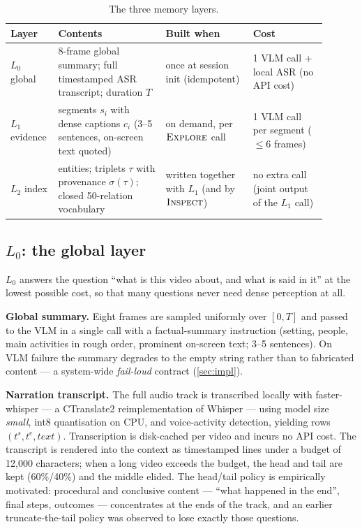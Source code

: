 \begin{table}[t]
  \centering
  \small
  \caption{The three memory layers.}
  \label{tab:layers}
  \begin{tabular}{@{}p{0.10\linewidth}p{0.32\linewidth}p{0.26\linewidth}p{0.22\linewidth}@{}}
    \toprule
    Layer & Contents & Built when & Cost \\
    \midrule
    $L_0$ global & 8-frame global summary; full timestamped ASR transcript; duration $T$ & once at session init (idempotent) & 1 VLM call + local ASR (no API cost) \\
    $L_1$ evidence & segments $s_i$ with dense captions $c_i$ (3--5 sentences, on-screen text quoted) & on demand, per $\textsc{Explore}$ call & 1 VLM call per segment ($\leq 6$ frames) \\
    $L_2$ index & entities; triplets $\tau$ with provenance $\sigma(\tau)$; closed 50-relation vocabulary & written together with $L_1$ (and by $\textsc{Inspect}$) & no extra call (joint output of the $L_1$ call) \\
    \bottomrule
  \end{tabular}
\end{table}

\subsection{$L_0$: the global layer}
\label{subsec:l0}

$L_0$ answers the question ``what is this video about, and what is said in it'' at the lowest
possible cost, so that many questions never need dense perception at all.

\textbf{Global summary.} Eight frames are sampled uniformly over $[0, T]$ and passed to the VLM in a
single call with a factual-summary instruction (setting, people, main activities in rough order,
prominent on-screen text; 3--5 sentences). On VLM failure the summary degrades to the empty string
rather than to fabricated content --- a system-wide \emph{fail-loud} contract (\cref{sec:impl}).

\textbf{Narration transcript.} The full audio track is transcribed locally with faster-whisper --- a
CTranslate2 reimplementation of Whisper \cite{radford2023whisper} --- using model size \emph{small}, int8
quantisation on CPU, and voice-activity detection, yielding rows
$(t^{s}, t^{e}, \mathit{text})$. Transcription is disk-cached per video and incurs no API cost.
The transcript is rendered into the context as timestamped lines under a budget of 12,000
characters; when a long video exceeds the budget, the head and tail are kept (60\%/40\%) and the
middle elided. The head/tail policy is empirically motivated: procedural and conclusive content ---
``what happened in the end'', final steps, outcomes --- concentrates at the ends of the track, and an
earlier truncate-the-tail policy was observed to lose exactly those questions.

